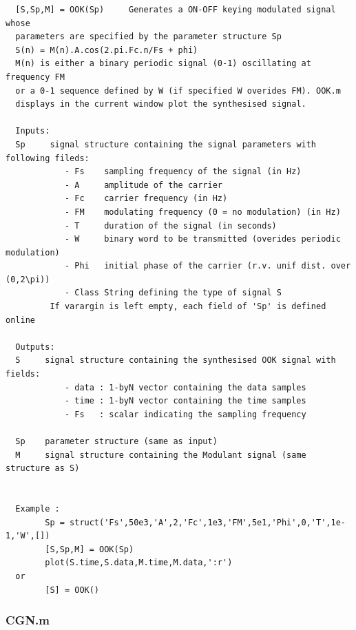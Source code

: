 \documentclass{article}
\begin{document}
        \color{lightgray} \begin{verbatim}  [S,Sp,M] = OOK(Sp)     Generates a ON-OFF keying modulated signal whose
  parameters are specified by the parameter structure Sp
  S(n) = M(n).A.cos(2.pi.Fc.n/Fs + phi)
  M(n) is either a binary periodic signal (0-1) oscillating at frequency FM
  or a 0-1 sequence defined by W (if specified W overides FM). OOK.m
  displays in the current window plot the synthesised signal.
 
  Inputs:
  Sp     signal structure containing the signal parameters with following fileds: 
            - Fs    sampling frequency of the signal (in Hz)
            - A     amplitude of the carrier
            - Fc    carrier frequency (in Hz)
            - FM    modulating frequency (0 = no modulation) (in Hz)
            - T     duration of the signal (in seconds)
            - W     binary word to be transmitted (overides periodic modulation)
            - Phi   initial phase of the carrier (r.v. unif dist. over (0,2\pi))
            - Class String defining the type of signal S
         If varargin is left empty, each field of 'Sp' is defined online
 
  Outputs:
  S     signal structure containing the synthesised OOK signal with fields:
            - data : 1-byN vector containing the data samples
            - time : 1-byN vector containing the time samples
            - Fs   : scalar indicating the sampling frequency
  
  Sp    parameter structure (same as input)
  M     signal structure containing the Modulant signal (same structure as S) 
    
 
  Example :
        Sp = struct('Fs',50e3,'A',2,'Fc',1e3,'FM',5e1,'Phi',0,'T',1e-1,'W',[])
        [S,Sp,M] = OOK(Sp) 
        plot(S.time,S.data,M.time,M.data,':r')
  or
        [S] = OOK() 
\end{verbatim} \color{black}


\subsubsection{CGN.m}
\end{document}
